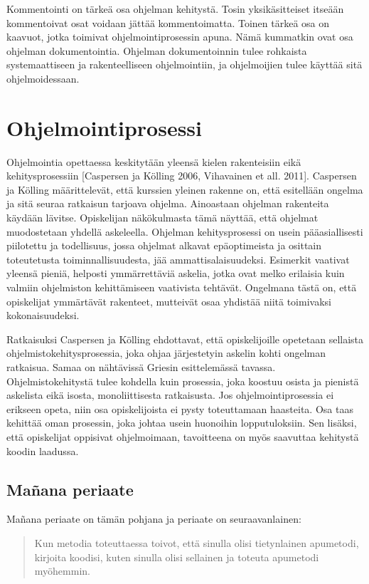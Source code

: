 \documentclass[a4paper]{article}
\begin{document}
Kommentointi on tärkeä osa ohjelman kehitystä. Tosin yksikäsitteiset itseään kommentoivat osat voidaan jättää kommentoimatta. Toinen tärkeä osa on kaavuot, jotka toimivat ohjelmointiprosessin apuna. Nämä kummatkin ovat osa ohjelman dokumentointia. Ohjelman dokumentoinnin tulee rohkaista systemaattiseen ja rakenteelliseen ohjelmointiin, ja ohjelmoijien tulee käyttää sitä ohjelmoidessaan.

\section{Ohjelmointiprosessi}

Ohjelmointia opettaessa keskitytään yleensä kielen rakenteisiin eikä kehitysprosessiin [Caspersen ja Kölling 2006, Vihavainen et all. 2011]. Caspersen ja Kölling määrittelevät, että kurssien yleinen rakenne on, että esitellään ongelma ja sitä seuraa ratkaisun tarjoava ohjelma. Ainoastaan ohjelman rakenteita käydään lävitse. Opiskelijan näkökulmasta tämä näyttää, että ohjelmat muodostetaan yhdellä askeleella. Ohjelman kehitysprosessi on usein pääasiallisesti piilotettu ja todellisuus, jossa ohjelmat alkavat epäoptimeista ja osittain toteutetusta toiminnallisuudesta, jää ammattisalaisuudeksi. Esimerkit vaativat yleensä pieniä, helposti ymmärrettäviä askelia, jotka ovat melko erilaisia kuin valmiin ohjelmiston kehittämiseen vaativista tehtävät. Ongelmana tästä on, että opiskelijat ymmärtävät rakenteet, mutteivät osaa yhdistää niitä toimivaksi kokonaisuudeksi.

Ratkaisuksi Caspersen ja Kölling ehdottavat, että opiskelijoille opetetaan sellaista ohjelmistokehitysprosessia, joka ohjaa järjestetyin askelin kohti ongelman ratkaisua. Samaa on nähtävissä Griesin esittelemässä tavassa. Ohjelmistokehitystä tulee kohdella kuin prosessia, joka koostuu osista ja pienistä askelista eikä isosta, monoliittisesta ratkaisusta. Jos ohjelmointiprosessia ei erikseen opeta, niin osa opiskelijoista ei pysty toteuttamaan haasteita. Osa taas kehittää oman prosessin, joka johtaa usein huonoihin lopputuloksiin. Sen lisäksi, että opiskelijat oppisivat ohjelmoimaan, tavoitteena on myös saavuttaa kehitystä koodin laadussa.

\subsection{Mañana periaate}

Mañana periaate on tämän pohjana ja periaate on seuraavanlainen:

\begin{quotation}
Kun metodia toteuttaessa toivot, että sinulla olisi tietynlainen apumetodi, kirjoita koodisi, kuten sinulla olisi sellainen ja toteuta apumetodi myöhemmin.
\end{quotation}
\end{document}
